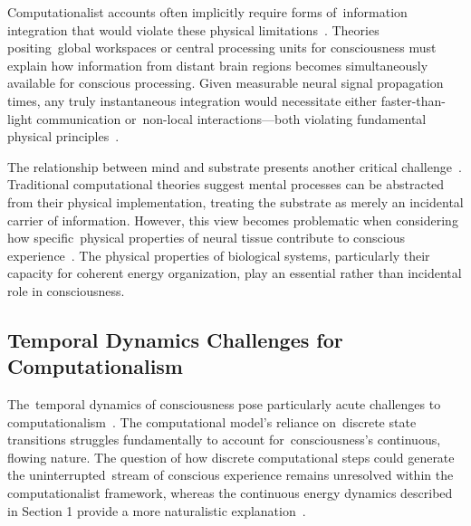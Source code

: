 Computationalist accounts often implicitly require forms of~information integration that would violate these physical limitations~\cite{bayne2010unity,mashour2020conscious}. Theories positing~global workspaces or central processing units for consciousness must explain how information from distant brain regions becomes simultaneously available for conscious processing. Given measurable neural signal propagation times, any truly instantaneous integration would necessitate either faster-than-light communication or~non-local interactions—both violating fundamental physical principles~\cite{pinotsis2023vivo,amil2024theta}.

The relationship between mind and substrate presents another critical challenge~\cite{polger2016multiple,gillett2016reduction}. Traditional computational theories suggest mental processes can be abstracted from their physical implementation, treating the substrate as merely an incidental carrier of information. However, this view becomes problematic when considering how specific~physical properties of neural tissue contribute to conscious experience~\cite{Gidon2020,Beniaguev2021}. The physical properties of biological systems, particularly their capacity for coherent energy organization, play an essential rather than incidental role in consciousness.

\subsection*{Temporal Dynamics Challenges for Computationalism}

The~temporal dynamics of consciousness pose particularly acute challenges to computationalism~\cite{zheng2025unbearable,amil2024theta}. The computational model's reliance on~discrete state transitions struggles fundamentally to account for~consciousness's continuous, flowing nature. The question of how discrete computational steps could generate the uninterrupted~stream of conscious experience remains unresolved within the computationalist framework, whereas the continuous energy dynamics described in Section 1 provide a more naturalistic explanation~\cite{breakspear2005dynamics,van2025processes}.

